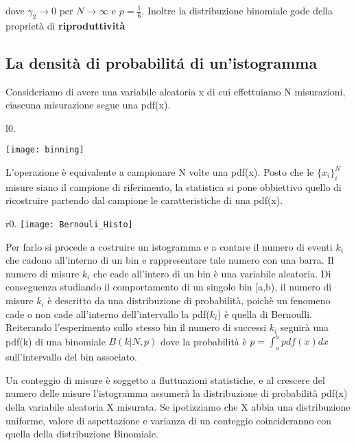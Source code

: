 dove $\gamma_2 \rightarrow 0$ per $N \rightarrow \infty$ e $p = \frac{1}{6}$.
Inoltre la distribuzione binomiale gode della propriet\`{a} di \textbf{riproduttivit\`{a}}
\subsection{La densit\`{a} di probabilit\'{a} di un'istogramma}


Consideriamo di avere una variabile aleatoria x di cui effettuiamo N misurazioni, ciascuna misurazione segue una pdf(x). 

\begin{wrapfigure}{l}{0.\textwidth}
\centering

\texttt{[image: binning]}	

\end{wrapfigure}

\noindent L'operazione \`{e} equivalente a campionare N volte una pdf(x). Posto che le $\{x_{i}\}_{i}^N$ misure siano il campione di riferimento, la statistica si pone obbiettivo quello di ricostruire partendo dal campione le caratteristiche di una pdf(x).
\begin{wrapfigure}{r}{0.\textwidth}
\centering
\texttt{[image: Bernouli\_Histo]}	

\end{wrapfigure}
Per farlo si procede a costruire un istogramma e a contare il numero di eventi $k_{i}$ che cadono all'interno di un bin e rappresentare tale numero con una barra. Il numero di misure $k_i$ che cade all'intero di un bin \`{e} una variabile aleatoria.
Di conseguenza studiando il comportamento di un singolo bin [a,b), il numero di misure $k_{i}$ \`{e} descritto da una distribuzione di probabilit\`{a}, poich\`{e} un fenomeno cade o non cade all'interno dell'intervallo la pdf($k_i$) \`{e} quella di Bernoulli. 
Reiterando l'esperimento sullo stesso bin il numero di successi $k_{i}$ seguir\`{a} una pdf(k) di una binomiale $B(k \vert N,p)$ dove la probabilit\`{a} \`{e} $ p = \int_{a}^{b}{pdf(x)dx}$ sull'intervallo del bin associato.

 Un conteggio di misure \`{e} soggetto a fluttuazioni statistiche, e al crescere del numero delle misure l'istogramma assumer\`{a} la distribuzione di probabilit\`{a} pdf(x) della variabile aleatoria X misurata.
\newline
\noindent Se ipotizziamo che X abbia una distribuzione uniforme, valore di aspettazione e varianza di un conteggio coincideranno con quella della distribuzione Binomiale.

